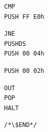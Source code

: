 \documentclass{scrartcl}
\begin{document}
            \begin{lstlisting}[firstnumber = 41]
CMP
PUSH FF E0h
            \end{lstlisting}
            \begin{lstlisting}[firstnumber = 45]
JNE
PUSHDS
PUSH 00 04h
            \end{lstlisting}
            \begin{lstlisting}[firstnumber = 50]
PUSH 00 02h
            \end{lstlisting}
            \begin{lstlisting}[firstnumber = 53]
OUT
POP
HALT
        \end{lstlisting}
        \lstset{belowskip = 0.0mm, numbers = none}
        \begin{lstlisting}
/*\$END*/
        \end{lstlisting}
    
\end{document}
